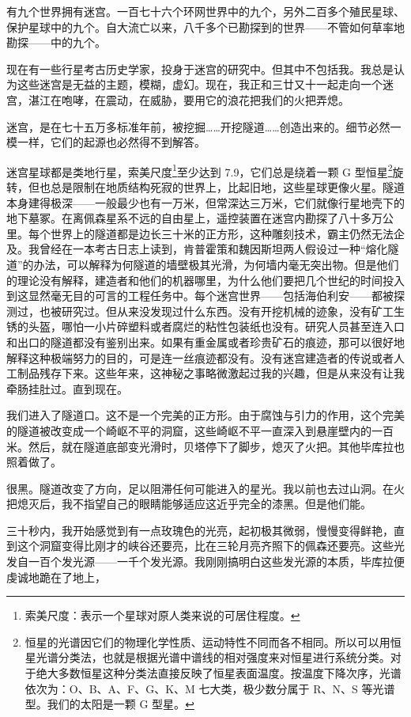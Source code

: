 \documentclass[AutoFakeBold=true]{book}
\begin{document}
有九个世界拥有迷宫。一百七十六个环网世界中的九个，另外二百多个殖民星球、保护星球中的九个。自大流亡以来，八千多个已勘探到的世界——不管如何草率地勘探——中的九个。

现在有一些行星考古历史学家，投身于迷宫的研究中。但其中不包括我。我总是认为这些迷宫是无益的主题，模糊，虚幻。现在，我正和三廿又十一起走向一个迷宫，湛江在咆哮，在震动，在威胁，要用它的浪花把我们的火把弄熄。

迷宫，是在七十五万多标准年前，被挖掘……开挖隧道……创造出来的。细节必然一模一样，它们的起源也必然得不到解答。

迷宫星球都是类地行星，索美尺度\footnote{索美尺度：表示一个星球对原人类来说的可居住程度。}至少达到 7.9，它们总是绕着一颗 G 型恒星\footnote{恒星的光谱因它们的物理化学性质、运动特性不同而各不相同。所以可以用恒星光谱分类法，也就是根据光谱中谱线的相对强度来对恒星进行系统分类。对于绝大多数恒星这种分类法直接反映了恒星表面温度。按温度下降次序，光谱依次为：O、B、A、F、G、K、M 七大类，极少数分属于 R、N、S 等光谱型。我们的太阳是一颗 G 型星。}旋转，但也总是限制在地质结构死寂的世界上，比起旧地，这些星球更像火星。隧道本身建得极深——一般最少也有一万米，但常深达三万米，它们就像行星地壳下的地下墓冢。在离佩森星系不远的自由星上，遥控装置在迷宫内勘探了八十多万公里。每个世界上的隧道都是边长三十米的正方形，这种雕刻技术，霸主仍然无法企及。我曾经在一本考古日志上读到，肯普霍策和魏因斯坦两人假设过一种``熔化隧道''的办法，可以解释为何隧道的墙壁极其光滑，为何墙内毫无突出物。但是他们的理论没有解释，建造者和他们的机器哪里，为什么他们要把几个世纪的时间投入到这显然毫无目的可言的工程任务中。每个迷宫世界——包括海伯利安——都被探测过，也被研究过。但从来没发现过什么东西。没有开挖机械的迹象，没有矿工生锈的头盔，哪怕一小片碎塑料或者腐烂的粘性包装纸也没有。研究人员甚至连入口和出口的隧道都没有鉴别出来。如果有重金属或者珍贵矿石的痕迹，那可以很好地解释这种极端努力的目的，可是连一丝痕迹都没有。没有迷宫建造者的传说或者人工制品残存下来。这些年来，这神秘之事略微激起过我的兴趣，但是从来没有让我牵肠挂肚过。直到现在。

我们进入了隧道口。这不是一个完美的正方形。由于腐蚀与引力的作用，这个完美的隧道被改变成一个崎岖不平的洞窟，这些崎岖不平一直深入到悬崖壁内的一百米。然后，就在隧道底部变光滑时，贝塔停下了脚步，熄灭了火把。其他毕库拉也照着做了。

很黑。隧道改变了方向，足以阻滞任何可能进入的星光。我以前也去过山洞。在火把熄灭后，我不指望自己的眼睛能够适应这近乎完全的漆黑。但是他们能。

三十秒内，我开始感觉到有一点玫瑰色的光亮，起初极其微弱，慢慢变得鲜艳，直到这个洞窟变得比刚才的峡谷还要亮，比在三轮月亮齐照下的佩森还要亮。这些光发自一百个发光源——一千个发光源。我刚刚搞明白这些发光源的本质，毕库拉便虔诚地跪在了地上，
\end{document}
